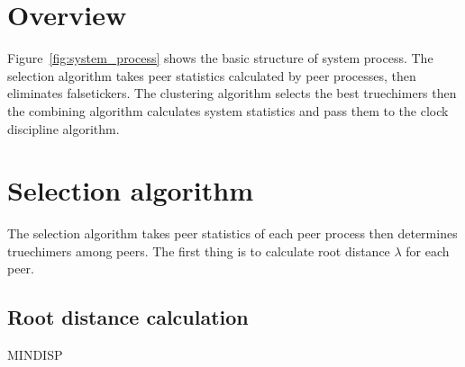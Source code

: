 \section{Overview}%
\label{sec:system_overview}

Figure~\ref{fig:system_process} shows the basic structure of system process.
The selection algorithm takes peer statistics calculated by peer processes,
then eliminates falsetickers. The clustering algorithm selects the best
truechimers then the combining algorithm calculates system statistics and pass
them to the clock discipline algorithm.



\section{Selection algorithm}%
\label{sec:selection_algorithm}
The selection algorithm takes peer statistics of each peer process then
determines truechimers among peers. The first thing is to calculate root
distance $\lambda$ for each peer.

\subsection{Root distance calculation}%
\label{sub:root_distance_calculation}

\begin{myverbbox}
    {\mindisp}MINDISP
\end{myverbbox}

